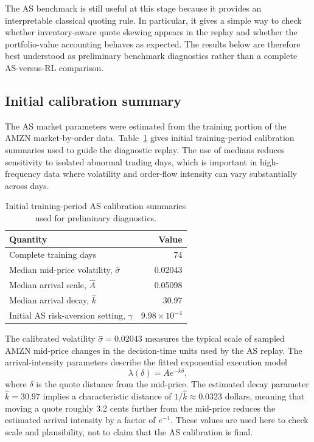 \documentclass[oneside]{uva-inf-bachelor-thesis}
\begin{document}
The AS benchmark is still useful at this stage because it provides an interpretable classical quoting rule. In particular, it gives a simple way to check whether inventory-aware quote skewing appears in the replay and whether the portfolio-value accounting behaves as expected. The results below are therefore best understood as preliminary benchmark diagnostics rather than a complete AS-versus-RL comparison.

\subsection{Initial calibration summary}
\label{subsec:as-training-calibration}

The AS market parameters were estimated from the training portion of the AMZN market-by-order data. Table~\ref{tab:as-train-median-params} gives initial training-period calibration summaries used to guide the diagnostic replay. The use of medians reduces sensitivity to isolated abnormal trading days, which is important in high-frequency data where volatility and order-flow intensity can vary substantially across days.

\begin{table}[htbp]
    \centering
    \caption{Initial training-period AS calibration summaries used for preliminary diagnostics.}
    \label{tab:as-train-median-params}
    \begin{tabular}{lr}
        \toprule
        Quantity & Value \\
        \midrule
        Complete training days & 74 \\
        Median mid-price volatility, $\hat{\sigma}$ & 0.02043 \\
        Median arrival scale, $\hat{A}$ & 0.05098 \\
        Median arrival decay, $\hat{k}$ & 30.97 \\
        Initial AS risk-aversion setting, $\gamma$ & $9.98\times 10^{-4}$ \\
        \bottomrule
    \end{tabular}
\end{table}

The calibrated volatility $\hat{\sigma}=0.02043$ measures the typical scale of sampled AMZN mid-price changes in the decision-time units used by the AS replay. The arrival-intensity parameters describe the fitted exponential execution model
\begin{equation}
    \lambda(\delta) = A e^{-k\delta},
\end{equation}
where $\delta$ is the quote distance from the mid-price. The estimated decay parameter $\hat{k}=30.97$ implies a characteristic distance of $1/\hat{k}\approx 0.0323$ dollars, meaning that moving a quote roughly 3.2 cents further from the mid-price reduces the estimated arrival intensity by a factor of $e^{-1}$. These values are used here to check scale and plausibility, not to claim that the AS calibration is final.
\end{document}
